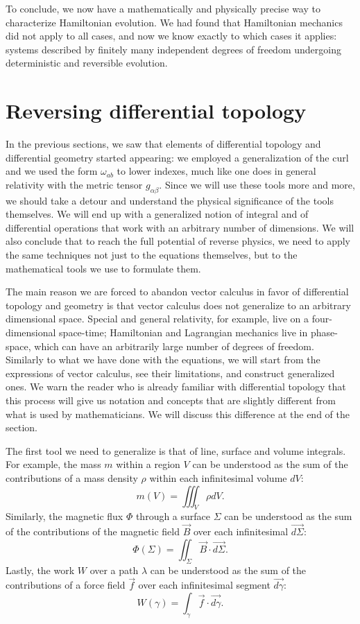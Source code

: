 To conclude, we now have a mathematically and physically precise way to characterize Hamiltonian evolution. We had found that Hamiltonian mechanics did not apply to all cases, and now we know exactly to which cases it applies: systems described by finitely many independent degrees of freedom undergoing deterministic and reversible evolution.

\section{Reversing differential topology}

In the previous sections, we saw that elements of differential topology and differential geometry started appearing: we employed a generalization of the curl and we used the form $\omega_{ab}$ to lower indexes, much like one does in general relativity with the metric tensor $g_{\alpha\beta}$. Since we will use these tools more and more, we should take a detour and understand the physical significance of the tools themselves. We will end up with a generalized notion of integral and of differential operations that work with an arbitrary number of dimensions. We will also conclude that to reach the full potential of reverse physics, we need to apply the same techniques not just to the equations themselves, but to the mathematical tools we use to formulate them.

The main reason we are forced to abandon vector calculus in favor of differential topology and geometry is that vector calculus does not generalize to an arbitrary dimensional space. Special and general relativity, for example, live on a four-dimensional space-time; Hamiltonian and Lagrangian mechanics live in phase-space, which can have an arbitrarily large number of degrees of freedom. Similarly to what we have done with the equations, we will start from the expressions of vector calculus, see their limitations, and construct generalized ones. We warn the reader who is already familiar with differential topology that this process will give us notation and concepts that are slightly different from what is used by mathematicians. We will discuss this difference at the end of the section.

The first tool we need to generalize is that of line, surface and volume integrals. For example, the mass $m$ within a region $V$ can be understood as the sum of the contributions of a mass density $\rho$ within each infinitesimal volume $dV$:
\begin{equation}
	m(V) = \iiint_V \rho dV.
\end{equation}
Similarly, the magnetic flux $\Phi$ through a surface $\Sigma$ can be understood as the sum of the contributions of the magnetic field $\vec{B}$ over each infinitesimal $\vec{d\Sigma}$:
\begin{equation*}
	\Phi(\Sigma) = \iint_\Sigma \vec{B} \cdot \vec{d\Sigma}.
\end{equation*}
Lastly, the work $W$ over a path $\lambda$ can be understood as the sum of the contributions of a force field $\vec{f}$ over each infinitesimal segment $\vec{d\gamma}$:
\begin{equation*}
	W(\gamma) = \int_\gamma \vec{f} \cdot \vec{d\gamma}.
\end{equation*}

